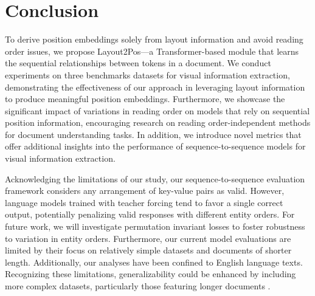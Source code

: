\section{Conclusion}

To derive position embeddings solely from layout information and avoid reading order issues, we propose Layout2Pos—a Transformer-based module that learns the sequential relationships between tokens in a document. We conduct experiments on three benchmarks datasets for visual information extraction, demonstrating the effectiveness of our approach in leveraging layout information to produce meaningful position embeddings. Furthermore, we showcase the significant impact of variations in reading order on models that rely on sequential position information, encouraging research on reading order-independent methods for document understanding tasks. In addition, we introduce novel metrics that offer additional insights into the performance of sequence-to-sequence models for visual information extraction.

Acknowledging the limitations of our study, our sequence-to-sequence evaluation framework considers any arrangement of key-value pairs as valid. However, language models trained with teacher forcing tend to favor a single correct output, potentially penalizing valid responses with different entity orders. For future work, we will investigate permutation invariant losses to foster robustness to variation in entity orders. Furthermore, our current model evaluations are limited by their focus on relatively simple datasets and documents of shorter length. Additionally, our analyses have been confined to English language texts. Recognizing these limitations, generalizability could be enhanced by including more complex datasets, particularly those featuring longer documents \citep{gralinski2020kleister}. 
